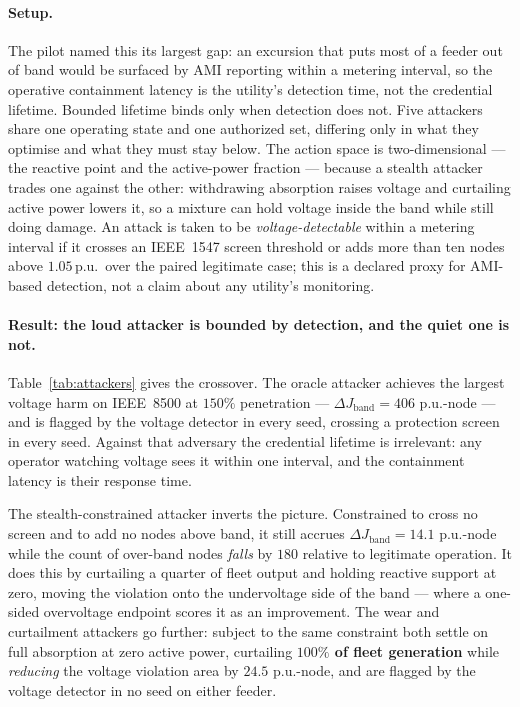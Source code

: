 \paragraph{Setup.} The pilot named this its largest gap: an excursion that puts most of a feeder
out of band would be surfaced by AMI reporting within a metering interval, so the operative
containment latency is the utility's detection time, not the credential lifetime. Bounded lifetime
binds only when detection does not. Five attackers share one operating state and one authorized
set, differing only in what they optimise and what they must stay below. The action space is
two-dimensional --- the reactive point and the active-power fraction --- because a stealth
attacker trades one against the other: withdrawing absorption raises voltage and curtailing active
power lowers it, so a mixture can hold voltage inside the band while still doing damage. An attack
is taken to be \emph{voltage-detectable} within a metering interval if it crosses an IEEE~1547
screen threshold or adds more than ten nodes above $1.05$\,p.u.\ over the paired legitimate case;
this is a declared proxy for AMI-based detection, not a claim about any utility's monitoring.

\paragraph{Result: the loud attacker is bounded by detection, and the quiet one is not.}
Table~\ref{tab:attackers} gives the crossover. The oracle attacker achieves the largest voltage
harm on IEEE~8500 at $150\%$ penetration --- $\Delta J_{\mathrm{band}} = 406$ p.u.-node --- and is
flagged by the voltage detector in every seed, crossing a protection screen in every seed. Against
that adversary the credential lifetime is irrelevant: any operator watching voltage sees it within
one interval, and the containment latency is their response time.

The stealth-constrained attacker inverts the picture. Constrained to cross no screen and to add no
nodes above band, it still accrues $\Delta J_{\mathrm{band}} = 14.1$ p.u.-node while the count of
over-band nodes \emph{falls} by $180$ relative to legitimate operation. It does this by curtailing
a quarter of fleet output and holding reactive support at zero, moving the violation onto the
undervoltage side of the band --- where a one-sided overvoltage endpoint scores it as an
improvement. The wear and curtailment attackers go further: subject to the same constraint both
settle on full absorption at zero active power, curtailing \textbf{$100\%$ of fleet generation}
while \emph{reducing} the voltage violation area by $24.5$ p.u.-node, and are flagged by the
voltage detector in no seed on either feeder.

